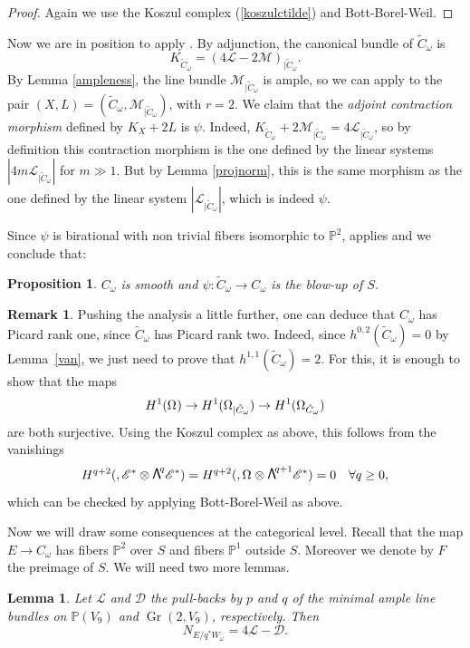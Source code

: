 \documentclass[JEP,XML,SOM,Unicode,NoEqCountersInSection]{cedram}
\newcommand{\NoChangel}[1]{%
\expandafter\let\csname old\string#1\endcsname=#1
\let#1=\relax
\newcommand{#1}{\mathcode`l="716C\csname old\string#1\endcsname\mathcode`l="7160 }%
}
\newcommand\bw[1]{{\hbox{\large$\mathsf{\Lambda}$}^{\!#1}}}
\let\mathcal\mathscr
\theoremstyle{plain}
\newtheorem{prop}[theorem]{Proposition}
\newtheorem{lemma}[theorem]{Lemma}
\theoremstyle{definition}
\newtheorem{remark}[theorem]{Remark}
\DeclareMathOperator{\Gr}{Gr}
\DeclareMathOperator{\Fl}{Fl}\NoChangel{\Fl}
\newcommand{\PP}{\mathbb{P}}
\newcommand{\sheaf}[1]{\mathcal{#1}}
\newcommand{\kd}{\sheaf{D}}
\newcommand{\ke}{\sheaf{E}}
\newcommand{\kl}{\sheaf{L}}
\newcommand{\km}{\sheaf{M}}
\begin{document}
\begin{proof}
Again we use the Koszul complex (\ref{koszulctilde}) and Bott-Borel-Weil.\end{proof}

Now we are in position to apply \cite{aw}. By adjunction, the
canonical bundle of $\tilde C_\omega$ is
\[
K_{\tilde C_\omega}=(4\kl-2\km)_{|\tilde C_\omega}.
\]
By Lemma \ref{ampleness}, the line bundle $\km_{|\tilde C_\omega}$ is ample, so we
can apply \cite[Th.\,4.1]{aw} to the pair $(X,L)=(\tilde C_\omega,\km_{|\tilde C_\omega})$,
with $r=2$. We claim that the {\it adjoint contraction morphism} defined by $K_X+2L$ is $\psi$.
Indeed, $K_{\tilde C_\omega}+2\km_{|\tilde C_\omega}=4\kl_{|\tilde C_\omega}$, so by definition
this contraction morphism is the one defined by the linear systems $|4m\kl_{|\tilde C_\omega}|$
for $m\gg1$. But by Lemma \ref{projnorm}, this is the same morphism as the one defined by the
linear system $|\kl_{|\tilde C_\omega}|$, which is indeed $\psi$.

Since $\psi$ is birational with non trivial fibers isomorphic to $\PP^2$, \cite[Th.\,4.1(iii)]{aw}
applies and we conclude that:\enlargethispage{-\baselineskip}%

\begin{prop}\label{blowupS}
$C_\omega$ is smooth and $\psi : \tilde C_\omega \to C_\omega$ is the blow-up of $S$.
\end{prop}

\begin{remark} Pushing the analysis a little further, one can deduce that $C_\omega$ has Picard rank one, since $\tilde C_\omega$ has Picard rank two. Indeed, since $h^{0,2}(\tilde C_\omega)=0$
by Lemma~\ref{van}, we just need to prove that $h^{1,1}(\tilde C_\omega)=2$.
For this, it is enough to show that the maps
\[
H^1(\Omega_{\Fl})\to H^1(\Omega_{{\Fl}|\tilde C_\omega})\to H^1(\Omega_{\tilde C_\omega})
\]
are both surjective. Using the Koszul complex as above, this follows from the vanishings
\[
H^{q+2}({\Fl}, \ke^*\otimes \bw{q}\ke^*)=H^{q+2}({\Fl}, \Omega_{\Fl}\otimes \bw{q+1}\ke^*)=0 \quad \forall q\ge 0,
\]
which can be checked by applying Bott-Borel-Weil as above.
\end{remark}

Now we will draw some consequences at the categorical level. Recall that the map $E\to C_\omega$
has fibers $\PP^2$ over $S$ and fibers $\PP^1$ outside $S$. Moreover we denote by $F$ the preimage
of $S$. We will need two more lemmas.

\begin{lemma}\label{normalE}
Let $\kl$ and $\kd$ the pull-backs by $p$ and $q$ of the minimal ample line bundles on $\PP(V_9)$ and $\Gr(2,V_9)$, respectively. Then
\[
N_{E/q^* W_\omega}=4\kl-\kd .
\]
\end{lemma}
\end{document}

